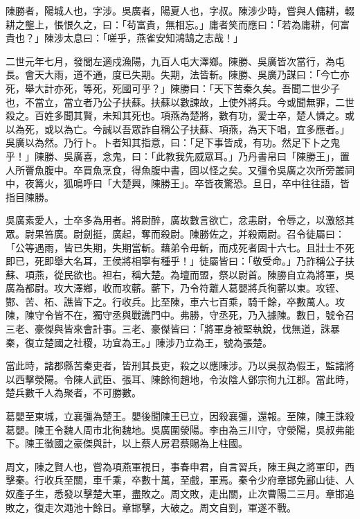 
\begin{pinyinscope}
陳勝者，陽城人也，字涉。吳廣者，陽夏人也，字叔。陳涉少時，嘗與人傭耕，輟耕之壟上，悵恨久之，曰：「茍富貴，無相忘。」庸者笑而應曰：「若為庸耕，何富貴也？」陳涉太息曰：「嗟乎，燕雀安知鴻鵠之志哉！」

二世元年七月，發閭左適戍漁陽，九百人屯大澤鄉。陳勝、吳廣皆次當行，為屯長。會天大雨，道不通，度已失期。失期，法皆斬。陳勝、吳廣乃謀曰：「今亡亦死，舉大計亦死，等死，死國可乎？」陳勝曰：「天下苦秦久矣。吾聞二世少子也，不當立，當立者乃公子扶蘇。扶蘇以數諫故，上使外將兵。今或聞無罪，二世殺之。百姓多聞其賢，未知其死也。項燕為楚將，數有功，愛士卒，楚人憐之。或以為死，或以為亡。今誠以吾眾詐自稱公子扶蘇、項燕，為天下唱，宜多應者。」吳廣以為然。乃行卜。卜者知其指意，曰：「足下事皆成，有功。然足下卜之鬼乎！」陳勝、吳廣喜，念鬼，曰：「此教我先威眾耳。」乃丹書帛曰「陳勝王」，置人所罾魚腹中。卒買魚烹食，得魚腹中書，固以怪之矣。又彊令吳廣之次所旁叢祠中，夜篝火，狐鳴呼曰「大楚興，陳勝王」。卒皆夜驚恐。旦日，卒中往往語，皆指目陳勝。

吳廣素愛人，士卒多為用者。將尉醉，廣故數言欲亡，忿恚尉，令辱之，以激怒其眾。尉果笞廣。尉劍挺，廣起，奪而殺尉。陳勝佐之，并殺兩尉。召令徒屬曰：「公等遇雨，皆已失期，失期當斬。藉弟令毋斬，而戍死者固十六七。且壯士不死即已，死即舉大名耳，王侯將相寧有種乎！」徒屬皆曰：「敬受命。」乃詐稱公子扶蘇、項燕，從民欲也。袒右，稱大楚。為壇而盟，祭以尉首。陳勝自立為將軍，吳廣為都尉。攻大澤鄉，收而攻蘄。蘄下，乃令符離人葛嬰將兵徇蘄以東。攻铚、酂、苦、柘、譙皆下之。行收兵。比至陳，車六七百乘，騎千餘，卒數萬人。攻陳，陳守令皆不在，獨守丞與戰譙門中。弗勝，守丞死，乃入據陳。數日，號令召三老、豪傑與皆來會計事。三老、豪傑皆曰：「將軍身被堅執銳，伐無道，誅暴秦，復立楚國之社稷，功宜為王。」陳涉乃立為王，號為張楚。

當此時，諸郡縣苦秦吏者，皆刑其長吏，殺之以應陳涉。乃以吳叔為假王，監諸將以西擊滎陽。令陳人武臣、張耳、陳餘徇趙地，令汝陰人鄧宗徇九江郡。當此時，楚兵數千人為聚者，不可勝數。

葛嬰至東城，立襄彊為楚王。嬰後聞陳王已立，因殺襄彊，還報。至陳，陳王誅殺葛嬰。陳王令魏人周市北徇魏地。吳廣圍滎陽。李由為三川守，守滎陽，吳叔弗能下。陳王徵國之豪傑與計，以上蔡人房君蔡賜為上柱國。

周文，陳之賢人也，嘗為項燕軍視日，事春申君，自言習兵，陳王與之將軍印，西擊秦。行收兵至關，車千乘，卒數十萬，至戲，軍焉。秦令少府章邯免酈山徒、人奴產子生，悉發以擊楚大軍，盡敗之。周文敗，走出關，止次曹陽二三月。章邯追敗之，復走次澠池十餘日。章邯擊，大破之。周文自剄，軍遂不戰。


\end{pinyinscope}
